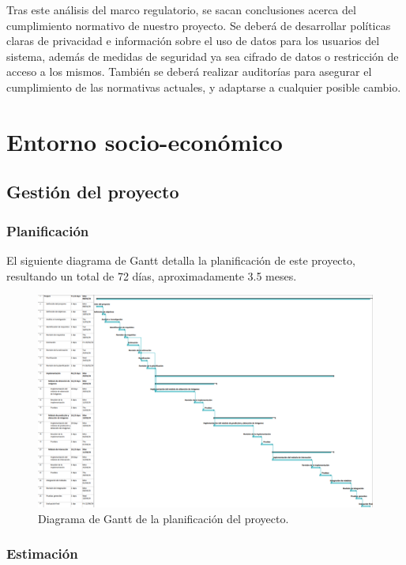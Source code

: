 \documentclass[12pt]{report} %
\begin{document}
Tras este análisis del marco regulatorio, se sacan conclusiones acerca del cumplimiento normativo de nuestro proyecto. Se deberá de desarrollar políticas claras de privacidad e información sobre el uso de datos para los usuarios del sistema, además de medidas de seguridad ya sea cifrado de datos o restricción de acceso a los mismos. También se deberá realizar auditorías para asegurar el cumplimiento de las normativas actuales, y adaptarse a cualquier posible cambio.



\chapter{Entorno socio-económico}

\section{Gestión del proyecto}

\subsection{Planificación}

El siguiente diagrama de Gantt detalla la planificación de este proyecto, resultando un total de 72 días, aproximadamente 3.5 meses. 

\begin{figure}[H]
	\centering
	\includegraphics[width=\textwidth]{ganttChart.png}
	\caption{Diagrama de Gantt de la planificación del proyecto.}
	\label{fig:imagen33}
\end{figure}

\subsection{Estimación}
\end{document}
